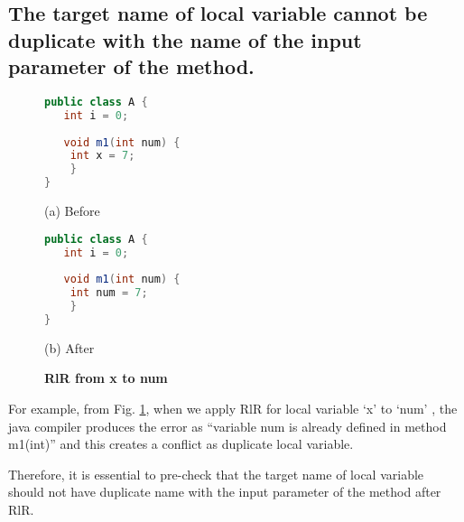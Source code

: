 \subsection{The target name of local variable cannot be duplicate with the name of the input parameter of the method.}

\begin{figure}[th]
\centering
\begin{minipage}[t]{0.45\linewidth}
\begin{lstlisting}[language=java, basicstyle=\scriptsize\ttfamily,frame=single]
public class A {
   int i = 0;
   
   void m1(int num) {
	int x = 7;
    }
}
\end{lstlisting}
\centering(a) Before
\end{minipage}
\hfill
\begin{minipage}[t]{0.45\linewidth}
\begin{lstlisting}[language=java, basicstyle=\scriptsize\ttfamily,frame=single]
public class A {
   int i = 0;
   
   void m1(int num) {
	int num = 7;
    }
}
\end{lstlisting}
\centering(b) After
\end{minipage}
\caption{\textbf{RlR from x to num}}
\label{figure:precond5_1}
\end{figure}

For example, from Fig. \ref{figure:precond5_1}, when we apply RlR for local variable `x' to `num' , the java compiler produces the error as ``variable num is already defined in method m1(int)'' and this creates a conflict as duplicate local variable.

Therefore, it is essential to pre-check that the target name of local variable should not have duplicate name with the input parameter of the method after RlR.